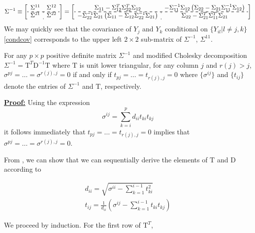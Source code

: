 \documentclass[12pt]{article}
\newcommand{\matD}{\mbox{D}}
\newcommand{\matT}{\mbox{T}}
\newenvironment{proposition}[1][Proposition]{\begin{trivlist}
\item[\hskip \labelsep {\bfseries #1}]}{\end{trivlist}}
\begin{document}
\begin{equation}
\Sigma^{-1} \equiv \left[\begin{array}{c:c} \Sigma^{11} & \Sigma^{12}  \\ \cdashline{1-2}  \hdashline \Sigma^{21} & \Sigma^{22}  \end{array}\right]  = \left[\begin{array}{c:c}  \Sigma_{11} - \Sigma_{12}^T\Sigma_{22}^T\Sigma_{12}  & -\Sigma_{11}^{-1}\Sigma_{12}\left(\Sigma_{22} - \Sigma_{21}\Sigma_{11}^{-1}\Sigma_{12} \right) \\ \cdashline{1-2}  \hdashline -\Sigma_{22}^{-1}\Sigma_{21}\left(\Sigma_{11} - \Sigma_{12}\Sigma_{22}^{-1}\Sigma_{21} \right)  &  \Sigma_{22} - \Sigma_{21}^T\Sigma_{11}^T\Sigma_{21}  \end{array}\right] 
\end{equation}
\noindent
We may quickly see that the covariance of $Y_{j}$ and $Y_{k}$ conditional on $\lbrace Y_{il}\vert l\ne j,k \rbrace$ \eqref{condcov} corresponds to the upper left $2 \times 2$ sub-matrix of $\Sigma^{-1}$, $\Sigma^{11}$. 

\begin{proposition}
For any $p\times p$ positive definite matrix $\Sigma^{-1}$ and modified Cholesky decomposition $\Sigma^{-1} = \matT^T \matD^{-1}\matT$ where $\matT$ is unit lower triangular, for any column $j$ and $r\left(j\right)>j$, $\sigma^{pj} = \dots = \sigma^{r\left(j\right),j} = 0$ if and only if $t_{pj} = \dots = t_{r\left(j\right),j} = 0$ where $\lbrace \sigma^{ij}\rbrace$ and $\lbrace t_{ij}\rbrace$ denote the entries of $\Sigma^{-1}$ and $\matT$, respectively.
\end{proposition}

\underline{\bf Proof:} Using the expression
\[
\sigma^{ij} = \sum_{k=i}^p d_{ii}t_{ki}t_{kj}
\]
it follows immediately that $t_{pj} = \dots = t_{r\left(j\right),j} = 0$ implies that $\sigma^{pj} = \dots = \sigma^{r\left(j\right),j} = 0$.

From \cite{watkins2004fundamentals}, we can show that we can sequentially derive the elements of $\matT$ and $\matD$ according to 

\begin{eqnarray*}
d_{ii} = \sqrt{\sigma^{ii}-\sum_{k=1}^{i-1} t_{ki}^2 }\\
t_{ij} = \frac{1}{d_{ii}}\left(\sigma^{ij} - \sum_{k=1}^{i-1} t_{ki}t_{kj} \right)
\end{eqnarray*}
\noindent

We proceed by induction. For the first row of $\matT^T$, 
\end{document}
